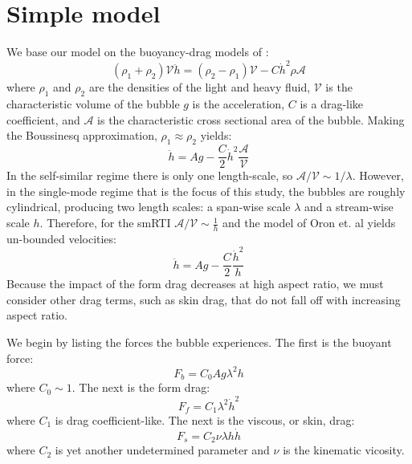 \section{Simple model}

We base our model on the buoyancy-drag models of \cite{Oron2001}:
\begin{equation}
(\rho_1 + \rho_2) \mathcal{V} \ddot{h} = (\rho_2 - \rho_1) \mathcal{V} - C \dot{h}^2 \rho \mathcal{A}
\end{equation}
where $\rho_1$ and $\rho_2$ are the densities of the light and heavy fluid,
$\mathcal{V}$ is the characteristic volume of the bubble
$g$ is the acceleration,
$C$ is a drag-like coefficient, and
$\mathcal{A}$ is the characteristic cross sectional area of the bubble.
Making the Boussinesq approximation, $\rho_1 \approx \rho_2$ yields:
\begin{equation}
\ddot{h} = A g - \frac{C}{2} \dot{h}^2 \frac{\mathcal{A}}{\mathcal{V}}
\end{equation}
In the self-similar regime there is only one length-scale, so $\mathcal{A}/\mathcal{V} \sim 1 / \lambda$.
However, in the single-mode regime that is the focus of this study, the bubbles are roughly cylindrical, producing two length scales: a span-wise scale $\lambda$ and a stream-wise scale $h$.
Therefore, for the smRTI $\mathcal{A}/\mathcal{V} \sim \frac{1}{h}$ and the model of Oron et. al yields un-bounded velocities:
\begin{equation}
\ddot{h} = A g - \frac{C}{2} \frac{\dot{h}^2}{h}
\end{equation}
Because the impact of the form drag decreases at high aspect ratio, we must consider other drag terms, such as skin drag, that do not fall off with increasing aspect ratio.

We begin by listing the forces the bubble experiences.  The first is the buoyant force:
\begin{equation}
F_b = C_0 A g \lambda^2 h
\end{equation}
where $C_0 \sim 1$.
The next is the form drag:
\begin{equation}
F_f = C_1 \lambda^2 \dot{h}^2
\end{equation}
where $C_1$ is drag coefficient-like.
The next is the viscous, or skin, drag:
\begin{equation}
F_s = C_2 \nu \lambda h \dot{h}
\end{equation}
where $C_2$ is yet another undetermined parameter and $\nu$ is the kinematic vicosity.

